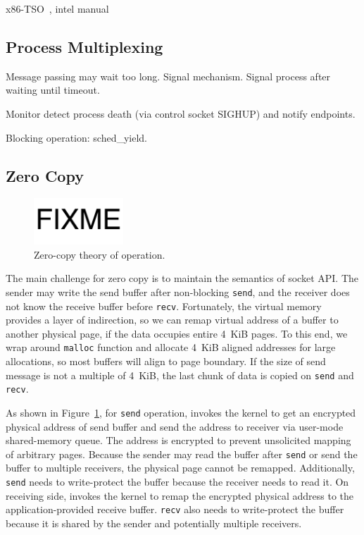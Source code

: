 x86-TSO~\cite{sewell2010x86}, intel manual~\cite{intel-manual}

\subsection{Process Multiplexing}
\label{subsec:epoll}


Message passing may wait too long.
Signal mechanism. Signal process after waiting until timeout.

Monitor detect process death (via control socket SIGHUP) and notify endpoints.

Blocking operation: sched\_yield.


\subsection{Zero Copy}
\label{subsec:zerocopy}

\begin{figure}[t]
	\centering
	\includegraphics[width=0.3\textwidth]{images/fixme}
	\caption{Zero-copy theory of operation.}
	\label{fig:zerocopy}
\end{figure}

The main challenge for zero copy is to maintain the semantics of socket API. The sender may write the send buffer after non-blocking \texttt{send}, and the receiver does not know the receive buffer before \texttt{recv}.
Fortunately, the virtual memory provides a layer of indirection, so we can remap virtual address of a buffer to another physical page, if the data occupies entire 4~KiB pages.
To this end, we wrap around \texttt{malloc} function and allocate 4~KiB aligned addresses for large allocations, so most buffers will align to page boundary.
If the size of send message is not a multiple of 4~KiB, the last chunk of data is copied on \texttt{send} and \texttt{recv}.

As shown in Figure~\ref{fig:zerocopy}, for \texttt{send} operation, \libipc{} invokes the kernel to get an encrypted physical address of send buffer and send the address to receiver via user-mode shared-memory queue.
The address is encrypted to prevent unsolicited mapping of arbitrary pages.
Because the sender may read the buffer after \texttt{send} or send the buffer to multiple receivers, the physical page cannot be remapped.
Additionally, \texttt{send} needs to write-protect the buffer because the receiver needs to read it.
On receiving side, \libipc{} invokes the kernel to remap the encrypted physical address to the application-provided receive buffer.
\texttt{recv} also needs to write-protect the buffer because it is shared by the sender and potentially multiple receivers.

